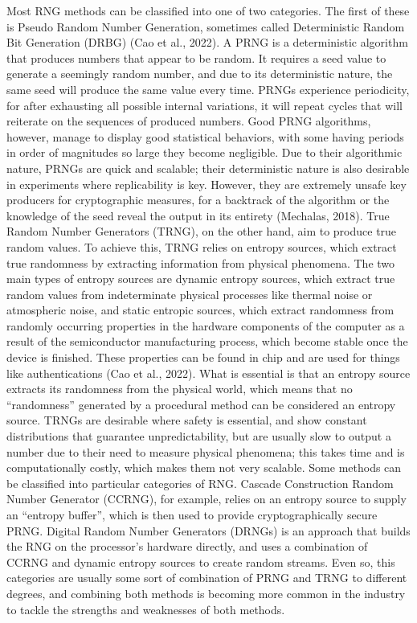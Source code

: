 Most RNG methods can be classified into one of two categories. The first of these is Pseudo Random Number Generation, sometimes called Deterministic Random Bit Generation (DRBG) (Cao et al., 2022). A PRNG is a deterministic algorithm that produces numbers that appear to be random. It requires a seed value to generate a seemingly random number, and due to its deterministic nature, the same seed will produce the same value every time. PRNGs experience periodicity, for after exhausting all possible internal variations, it will repeat cycles that will reiterate on the sequences of produced numbers. Good PRNG algorithms, however, manage to display good statistical behaviors, with some having periods in order of magnitudes so large they become negligible. Due to their algorithmic nature, PRNGs are quick and scalable; their deterministic nature is also desirable in experiments where replicability is key. However, they are extremely unsafe key producers for cryptographic measures, for a backtrack of the algorithm or the knowledge of the seed reveal the output in its entirety  (Mechalas, 2018). 
True Random Number Generators (TRNG), on the other hand, aim to produce true random values. To achieve this, TRNG relies on entropy sources, which extract true randomness by extracting information from physical phenomena. The two main types of entropy sources are dynamic entropy sources, which extract true random values from indeterminate physical processes like thermal noise or atmospheric noise, and static entropic sources, which extract randomness from randomly occurring properties in the hardware components of the computer as a result of the semiconductor manufacturing process, which become stable once the device is finished. These properties can be found in chip and are used for things like authentications (Cao et al., 2022). What is essential is that an entropy source extracts its randomness from the physical world, which means that no “randomness” generated by a procedural method can be considered an entropy source. TRNGs are desirable where safety is essential, and show constant distributions that guarantee unpredictability, but are usually slow to output a number due to their need to measure physical phenomena; this takes time and is computationally costly, which makes them not very scalable.
Some methods can be classified into particular categories of RNG.  Cascade Construction Random Number Generator (CCRNG), for example, relies on an entropy source to supply an “entropy buffer”, which is then used to provide cryptographically secure PRNG. Digital Random Number Generators (DRNGs) is an approach that builds the RNG on the processor’s hardware directly, and uses a combination of CCRNG and dynamic entropy sources to create random streams. Even so, this categories are usually some sort of combination of PRNG and TRNG to different degrees, and combining both methods is becoming more common in the industry to tackle the strengths and weaknesses of both methods.
